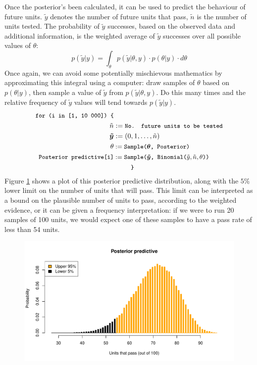 \documentclass[11pt,a4paper,article]{memoir} %
\begin{document}
\par
Once the posterior's been calculated, it can be used to predict the behaviour of future units. $\tilde{y}$ denotes the number of future units that pass, $\tilde{n}$ is the number of units tested. The probability of $\tilde{y}$ successes, based on the observed data and additional information, is the weighted average of $\tilde{y}$ successes over all possible values of $\theta$:
\begin{equation}
	p(\tilde{y}|y) = \int_{\theta}p(\tilde{y}|\theta, y)\cdot p(\theta|y) \cdot d\theta
\end{equation}
Once again, we can avoid some potentially mischievous mathematics by approximating this integral using a computer: draw samples of $\theta$ based on $p(\theta|y)$, then sample a value of $\tilde{y}$ from $p(\tilde{y}|\theta, y)$. Do this many times and the relative frequency of $\tilde{y}$ values will tend towards $p(\tilde{y}|y)$.
\begin{align}
\small{\texttt{for (i in [1, 10 000]) \{}} &\\
	\tilde{n} &:= \small{\texttt{No. future units to be tested}} \\
	\boldsymbol{\tilde{y}} &:= (0, 1, \dots, \tilde{n}) \\
	\theta &:= \small{\texttt{Sample(}}\boldsymbol{\theta}\small{\texttt{, Posterior)}} \\
	\small{\texttt{Posterior predictive[i]}} &:= \small{\texttt{Sample(}}\boldsymbol{\tilde{y}}\small{\texttt{, Binomial(}}\tilde{y}, \tilde{n}, \theta\small{\texttt{))}}\\
	&\quad\quad \small{\texttt{ \} }}
\end{align}
Figure \ref{fig:posterior_predictive} shows a plot of this posterior predictive distribution, along with the $5\%$ lower limit on the number of units that will pass. This limit can be interpreted as a bound on the plausible number of units to pass, according to the weighted evidence, or it can be given a frequency interpretation: if we were to run 20 samples of 100 units, we would expect one of these samples to have a pass rate of less than 54 units.
\begin{figure}
\includegraphics[width=\textwidth]{posterior_predictive.pdf}
\caption{}
\label{fig:posterior_predictive}
\end{figure}
\end{document}
